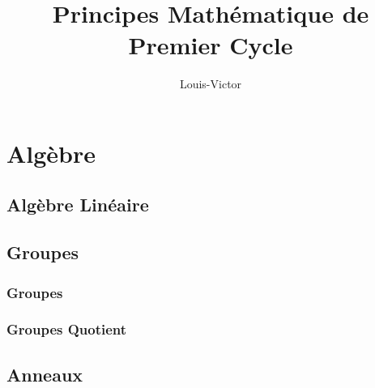 \documentclass{book}
\title{Principes Mathématique de Premier Cycle}
\author{Louis-Victor}
\theoremstyle{plain}
\theoremstyle{definition}
\begin{document}
\maketitle
\date{}
\tableofcontents
\newpage
\part{Algèbre}
\chapter{Algèbre Linéaire}


\chapter{Groupes}
\label{ch:group}

\section{Groupes}
\label{sec:group-group}
\section{Groupes Quotient}
\label{sec:group-quotients}

\label{part:alg}
\chapter{Anneaux}

\end{document}
